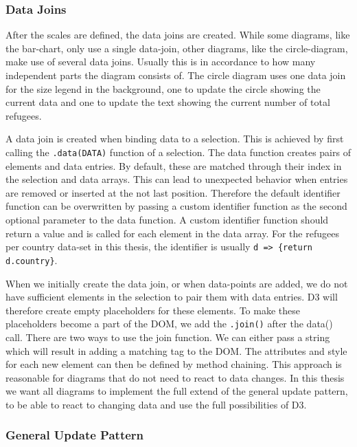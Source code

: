 \subsubsection{Data Joins}
After the scales are defined, the data joins are created. While some diagrams, like the bar-chart, only use a single data-join, other diagrams, like the circle-diagram, make use of several data joins. Usually this is in accordance to how many independent parts the diagram consists of. The circle diagram uses one data join for the size legend in the background, one to update the circle showing the current data and one to update the text showing the current number of total refugees.

A data join is created when binding data to a selection. This is achieved by first calling the \verb|.data(DATA)| function of a selection. The data function creates pairs of elements and data entries. By default, these are matched through their index in the selection and data arrays. This can lead to unexpected behavior when entries are removed or inserted at the not last position. Therefore the default identifier function can be overwritten by passing a custom identifier function as the second optional parameter to the data function. A custom identifier function should return a value and is called for each element in the data array. For the refugees per country data-set in this thesis, the identifier is usually \verb|d => {return d.country}|.

When we initially create the data join, or when data-points are added, we do not have sufficient elements in the selection to pair them with data entries. D3 will therefore create empty placeholders for these elements. To make these placeholders become a part of the DOM, we add the \verb|.join()| after the data() call. There are two ways to use the join function. We can either pass a string which will result in adding a matching tag to the DOM. The attributes and style for each new element can then be defined by method chaining. This approach is reasonable for diagrams that do not need to react to data changes. In this thesis we want all diagrams to implement the full extend of the general update pattern, to be able to react to changing data and use the full possibilities of D3.

\subsubsection{General Update Pattern}

